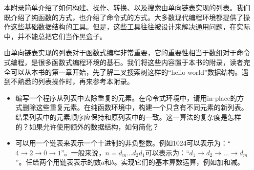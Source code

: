 \documentclass[UTF8]{article}
\begin{document}
本附录简单介绍了如何构建、操作、转换、以及搜索由单向链表实现的列表。我们既介绍了纯函数的方式，也介绍了命令式的方式。大多数现代编程环境都提供了操作这些基础数据结构的工具。但是，这些工具往往被设计来解决通用问题，在实际中，并不能总把它们当作黑盒子。

由单向链表实现的列表对于函数式编程非常重要，它的重要性相当于数组对于命令式编程，是很多函数式编程环境的基石。我们将这些内容置于本书的附录，读者完全可以从本书的第一章开始，先了解二叉搜索树这样的“hello world”数据结构。遇到不熟悉的列表操作时，再来参考本附录。

\begin{Exercise}
\begin{itemize}
\item 编写一个程序从列表中去除重复的元素。在命令式环境中，请用in-place的方式删除这些重复元素。在纯函数环境中，构建一个只含有不同元素的新列表。结果列表中的元素顺序应保持和原列表中的一致。这一算法的复杂度是怎样的？如果允许使用额外的数据结构，如何简化？
\item 可以用一个链表来表示一个十进制的非负整数。例如1024可以表示为：“$4 \rightarrow 2 \rightarrow 0 \rightarrow 1$”。一般来说，$n = d_m...d_2d_1$可以表示为：“$d_1 \rightarrow d_2 \rightarrow ... \rightarrow d_m$”。任给两个用链表表示的数$a$和$b$。实现它们的基本算数运算，例如加和减。
\end{itemize}
\end{Exercise}

\end{document}
